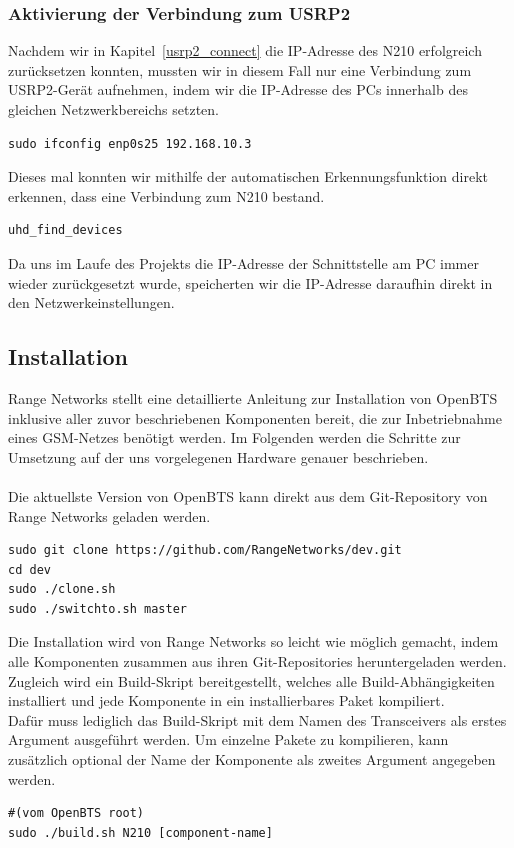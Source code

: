 \subsubsection{Aktivierung der Verbindung zum USRP2}
Nachdem wir in Kapitel~\ref{usrp2_connect} die IP-Adresse des N210 erfolgreich zurücksetzen konnten, mussten wir in diesem Fall nur eine Verbindung zum USRP2-Gerät aufnehmen, indem wir die IP-Adresse des PCs innerhalb des gleichen Netzwerkbereichs setzten.
\begin{lstlisting}
sudo ifconfig enp0s25 192.168.10.3
\end{lstlisting}

Dieses mal konnten wir mithilfe der automatischen Erkennungsfunktion direkt erkennen, dass eine Verbindung zum N210 bestand.
\begin{lstlisting}
uhd_find_devices
\end{lstlisting}

Da uns im Laufe des Projekts die IP-Adresse der Schnittstelle am PC immer wieder zurückgesetzt wurde, speicherten wir die IP-Adresse daraufhin direkt in den Netzwerkeinstellungen.

\subsection{Installation}
Range Networks stellt eine detaillierte Anleitung zur Installation von OpenBTS inklusive aller zuvor beschriebenen Komponenten bereit, die zur Inbetriebnahme eines GSM-Netzes benötigt werden. Im Folgenden werden die Schritte zur Umsetzung auf der uns vorgelegenen Hardware genauer beschrieben.\\
\\
Die aktuellste Version von OpenBTS kann direkt aus dem Git-Repository von Range Networks geladen werden.
\begin{lstlisting}
sudo git clone https://github.com/RangeNetworks/dev.git
cd dev
sudo ./clone.sh
sudo ./switchto.sh master
\end{lstlisting}

Die Installation wird von Range Networks so leicht wie möglich gemacht, indem alle Komponenten zusammen aus ihren Git-Repositories heruntergeladen werden. Zugleich wird ein Build-Skript bereitgestellt, welches alle Build-Abhängigkeiten installiert und jede Komponente in ein installierbares Paket kompiliert.\\
Dafür muss lediglich das Build-Skript mit dem Namen des Transceivers als erstes Argument ausgeführt werden. Um einzelne Pakete zu kompilieren, kann zusätzlich optional der Name der Komponente als zweites Argument angegeben werden.
\begin{lstlisting}
#(vom OpenBTS root)
sudo ./build.sh N210 [component-name]
\end{lstlisting}

